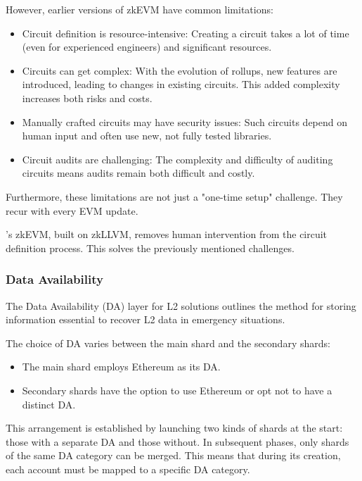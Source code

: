 However, earlier versions of zkEVM have common limitations:
\begin{itemize}
    \item Circuit definition is resource-intensive: 
        Creating a circuit takes a lot of time (even for experienced engineers) 
        and significant resources.
    \item Circuits can get complex: With the evolution of rollups, new features 
        are introduced, leading to changes in existing circuits. 
        This added complexity increases both risks and costs.
    \item Manually crafted circuits may have security issues: 
        Such circuits depend on human input and often use new, 
        not fully tested libraries.
    \item Circuit audits are challenging: 
        The complexity and difficulty of auditing circuits
        means audits remain both difficult and costly.
\end{itemize}

Furthermore, these limitations are not just a "one-time setup" challenge. 
They recur with every EVM update.

\nil's zkEVM, built on zkLLVM, removes human intervention 
from the circuit definition process. 
This solves the previously mentioned challenges.

\subsubsection{Data Availability}
\label{section:da}

The Data Availability (DA) layer for L2 solutions outlines the method for storing 
information essential to recover L2 data in emergency situations.

The choice of DA varies between the main shard and the secondary shards:
\begin{itemize}
    \item The main shard employs Ethereum as its DA.
    \item Secondary shards have the option to use Ethereum or 
        opt not to have a distinct DA.
\end{itemize}

This arrangement is established by launching two kinds of shards at the start: 
those with a separate DA and those without. 
In subsequent phases, only shards of the same DA category can be merged. 
This means that during its creation, each account must be mapped 
to a specific DA category. 

